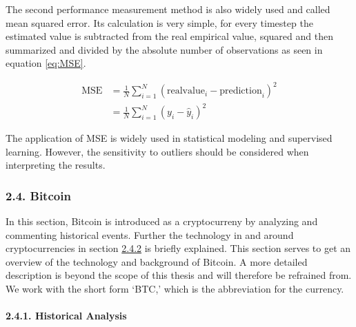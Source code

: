 \documentclass[
]{article}
\begin{document}
The second performance measurement method is also widely used and called
mean squared error. Its calculation is very simple, for every timestep
the estimated value is subtracted from the real empirical value, squared
and then summarized and divided by the absolute number of observations
as seen in equation \ref{eq:MSE}.

\begin{align} \label{eq:MSE}
  \text{MSE} &= \frac{1}{N}\sum_{i = 1}^{N}(\text{realvalue}_{i}-\text{prediction}_{i})^2 \\
  &= \frac{1}{N}\sum_{i = 1}^{N}(y_{i}-\hat{y}_{i})^2
\end{align}  

The application of MSE is widely used in statistical modeling and
supervised learning. However, the sensitivity to outliers should be
considered when interpreting the results.

\newpage

\hypertarget{bitcoin}{%
\subsubsection{2.4. Bitcoin}\label{bitcoin}}

In this section, Bitcoin is introduced as a cryptocurreny by analyzing
and commenting historical events. Further the technology in and around
cryptocurrencies in section \protect\hyperlink{bitcoin_tec}{2.4.2} is
briefly explained. This section serves to get an overview of the
technology and background of Bitcoin. A more detailed description is
beyond the scope of this thesis and will therefore be refrained from. We
work with the short form `BTC,' which is the abbreviation for the
currency.

\hypertarget{historical_analysis}{%
\paragraph{2.4.1. Historical Analysis}\label{historical_analysis}}

~
\end{document}
